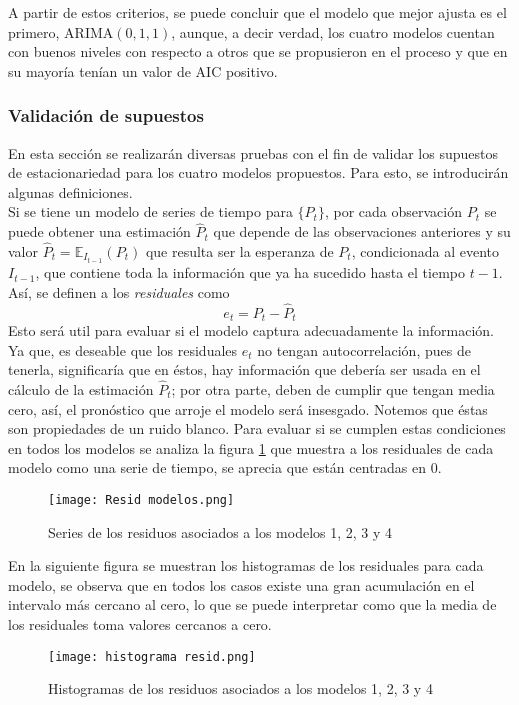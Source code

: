 \documentclass{article}
\theoremstyle{remark}
\begin{document}
A partir de estos criterios, se puede concluir que el modelo que mejor ajusta es el primero,  ARIMA$(0,1,1)$, aunque, a decir verdad, los cuatro modelos cuentan con buenos niveles con respecto a otros que se propusieron en el proceso y que en su mayoría tenían un valor de AIC positivo.


\subsubsection{Validación de supuestos}
En esta sección se realizarán diversas pruebas con el fin de validar los supuestos de estacionariedad para los cuatro modelos propuestos. Para esto, se introducirán algunas definiciones. \\

Si se tiene un  modelo de series de tiempo para $\{P_t\}$, por cada  observación $P_t$ se puede obtener una estimación $\hat{P}_t$ que depende de las observaciones anteriores y su valor $\hat{P}_t = \mathbb{E}_{I_{t-1}}(P_t)$ que resulta ser la esperanza de $P_t$, condicionada al evento $I_{t-1}$, que contiene toda la información que ya ha sucedido hasta el tiempo $t-1$.  Así, se definen a los \textit{residuales} como 
\[e_t = P_t - \hat{P}_t \]
Esto será util para evaluar si el modelo captura adecuadamente la información. Ya que, es deseable que los residuales $e_t$ no tengan autocorrelación, pues de tenerla, significaría que en éstos, hay información que debería ser usada en el cálculo de la estimación $\hat{P}_t$; por otra parte, deben de cumplir que tengan media cero, así, el pronóstico que arroje el modelo será insesgado. Notemos que éstas son propiedades de un ruido blanco. Para evaluar si se cumplen estas condiciones en todos los modelos  se analiza la figura \ref{resid_1} que muestra a los residuales de cada modelo como una serie de tiempo, se aprecia que están centradas en 0.
\begin{figure}[H]
\centering
\texttt{[image: Resid modelos.png]}
\caption{Series de los residuos asociados a los modelos 1, 2, 3 y 4 }
\label{resid_1}
\end{figure}
En la siguiente figura se muestran los histogramas de los residuales para cada modelo, se observa que en todos los casos existe una gran acumulación en el intervalo más cercano al cero, lo que se puede interpretar como que la media de los residuales toma valores cercanos a cero.
\begin{figure}[H]
\centering
\texttt{[image: histograma resid.png]}
\caption{Histogramas de los residuos asociados a los modelos 1, 2, 3 y 4 }
\label{sar8}
\end{figure}
\end{document}
